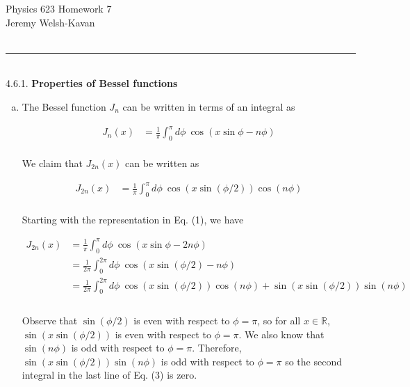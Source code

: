 \documentclass[]{article}
\begin{document}
{\Large Physics 623 Homework 7}\\
{Jeremy Welsh-Kavan}\\
\hfill \\
\noindent\rule{15cm}{0.4pt} \\



4.6.1. {\bf Properties of Bessel functions} \\

\begin{enumerate}[a)]

\item The Bessel function $J_n$ can be written in terms of an integral as


\begin{equation}
\begin{aligned}
J_n(x) & =  \frac{1}{\pi} \int_{0}^{\pi}  d\phi \: \cos( x \sin\phi - n\phi) \\
\end{aligned}
\end{equation}

We claim that $J_{2n}(x)$ can be written as

\begin{equation}
\begin{aligned}
J_{2n}(x) & =  \frac{1}{\pi} \int_{0}^{\pi}  d\phi \: \cos( x \sin(\phi/2) ) \cos(n\phi) \\
\end{aligned}
\end{equation}

Starting with the representation in Eq. (1), we have

\begin{equation}
\begin{aligned}
J_{2n}(x) & =  \frac{1}{\pi} \int_{0}^{\pi}  d\phi \: \cos( x \sin\phi - 2n\phi) \\
%
& =  \frac{1}{2\pi} \int_{0}^{2\pi}  d\phi \:   \cos( x \sin(\phi/2) - n\phi)  \\
%
& =  \frac{1}{2\pi} \int_{0}^{2\pi}  d\phi \:   \cos( x \sin(\phi/2)) \cos(n\phi) +  \sin( x \sin(\phi/2)) \sin(n\phi)   \\
%
\end{aligned}
\end{equation} \\

Observe that $ \sin(\phi/2)$ is even with respect to $\phi = \pi$, so for all $x \in \mathbb{R}$,   $\sin( x \sin(\phi/2))$ is even with respect to $\phi = \pi$. We also know that $\sin(n\phi)$ is odd with respect to $\phi = \pi$. Therefore, $\sin( x \sin(\phi/2)) \sin(n\phi)$ is odd with respect to $\phi = \pi$ so the second integral in the last line of Eq. (3) is zero. \\


\end{enumerate}
\end{document}
